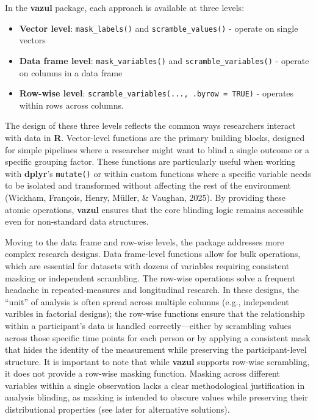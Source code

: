\documentclass[
  english,
  man,floatsintext]{apa6}
\providecommand{\tightlist}{%
  \setlength{\itemsep}{0pt}\setlength{\parskip}{0pt}}
\begin{document}
In the \textbf{vazul} package, each approach is available at three levels:

\begin{itemize}
\tightlist
\item
  \textbf{Vector level}: \texttt{mask\_labels()} and \texttt{scramble\_values()} - operate on single vectors
\item
  \textbf{Data frame level}: \texttt{mask\_variables()} and \texttt{scramble\_variables()} - operate on columns in a data frame
\item
  \textbf{Row-wise level}: \texttt{scramble\_variables(...,\ .byrow\ =\ TRUE)} - operates within rows across columns.
\end{itemize}

The design of these three levels reflects the common ways researchers interact with data in \textbf{R}. Vector-level functions are the primary building blocks, designed for simple pipelines where a researcher might want to blind a single outcome or a specific grouping factor. These functions are particularly useful when working with \textbf{dplyr}'s \texttt{mutate()} or within custom functions where a specific variable needs to be isolated and transformed without affecting the rest of the environment (Wickham, François, Henry, Müller, \& Vaughan, 2025). By providing these atomic operations, \textbf{vazul} ensures that the core blinding logic remains accessible even for non-standard data structures.

Moving to the data frame and row-wise levels, the package addresses more complex research designs. Data frame-level functions allow for bulk operations, which are essential for datasets with dozens of variables requiring consistent masking or independent scrambling. The row-wise operations solve a frequent headache in repeated-measures and longitudinal research. In these designs, the ``unit'' of analysis is often spread across multiple columns (e.g., independent varibles in factorial designs); the row-wise functions ensure that the relationship within a participant's data is handled correctly---either by scrambling values across those specific time points for each person or by applying a consistent mask that hides the identity of the measurement while preserving the participant-level structure. It is important to note that while \textbf{vazul} supports row-wise scrambling, it does not provide a row-wise masking function. Masking across different variables within a single observation lacks a clear methodological justification in analysis blinding, as masking is intended to obscure values while preserving their distributional properties (see later for alternative solutions).
\end{document}
